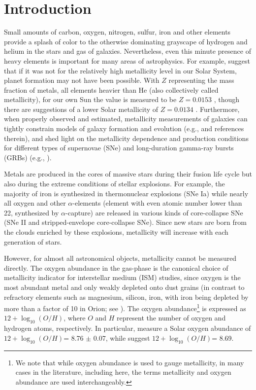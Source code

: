\documentclass{emulateapj}
\newcommand{\oxabinline}{\ensuremath{12 + \log_{10}(O/H)}}
\begin{document}
\section{Introduction}
Small amounts of carbon, oxygen, nitrogen, sulfur, iron and other elements provide a splash of color to the otherwise dominating grayscape of hydrogen and helium in the stars and gas of galaxies. Nevertheless, even this minute presence of heavy elements is important for many areas of astrophysics. For example, \citet{johnson12} suggest that if it was not for the relatively high metallicity level in our Solar System, planet formation may not have been possible. With $Z$ representing the mass fraction of metals, all elements heavier than He (also collectively called metallicity), for our own Sun the value is measured to be  $Z=0.0153$ \citep{chaffau11}, though there are suggestions of a lower Solar metallicity of $Z=0.0134$  \citep{asplund09_rev,grevesse10}. 
Furthermore, when properly observed and estimated, metallicity measurements of galaxies can tightly constrain models of galaxy formation and evolution (e.g., \citealt{kewley08} and references therein), and shed light on the metallicity dependence and production conditions for different types of supernovae (SNe) and long-duration gamma-ray bursts (GRBs) (e.g., \citealt{modjaz08_Z,levesque10_grbhosts,anderson10,modjaz11,kelly12,sanders12,leloudas14,lunnan14,pan14}).

Metals are produced in the cores of massive stars during their fusion life cycle but also during the extreme conditions of stellar explosions. For example, the majority of iron is synthesized in thermonuclear explosions (SNe Ia) while nearly all oxygen and other $\alpha$-elements (element with even atomic number lower than 22, synthesized by $\alpha$-capture) are released in various kinds of core-collapse SNe (SNe II and stripped-envelope core-collapse SNe). Since new stars are born from the clouds enriched by these explosions, metallicity will increase with each generation of stars. 


However, for almost all astronomical objects, metallicity cannot be measured directly. The oxygen abundance in the gas-phase is the canonical choice of metallicity indicator for interstellar medium (ISM) studies, since oxygen is the most abundant metal and only weakly depleted onto dust grains (in contrast to refractory elements such as magnesium, silicon, iron, with iron being depleted by more than a factor of 10 in Orion; see \citealt{simondiaz11-orion}). The oxygen abundance\footnote{We note that while oxygen abundance is used to gauge metallicity, in many cases in the literature, including here, the terms metallicity and oxygen abundance are used interchangeably.} is expressed as  \oxabinline, where $O$ and $H$ represent the number of oxygen and hydrogen atoms, respectively. In particular, \citealt{chaffau11} measure a Solar oxygen abundance of \oxabinline = 8.76 $\pm$ 0.07, while \citet{asplund09_rev} suggest \oxabinline = 8.69.
\end{document}
